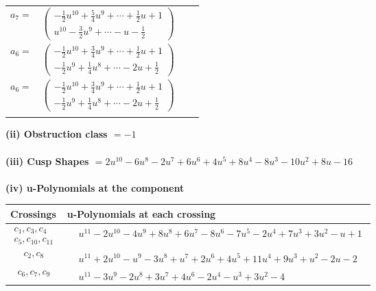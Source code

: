\documentclass[1p]{elsarticle_modified}
\theoremstyle{definition}
\begin{document}
\begin{tabular}{m{7pt} m{180pt} m{7pt} m{180pt} }
\flushright $a_{7}=$&$\begin{pmatrix}-\frac{1}{2} u^{10}+\frac{5}{4} u^9+\cdots+\frac{1}{2} u+1\\u^{10}-\frac{3}{2} u^9+\cdots- u-\frac{1}{2}\end{pmatrix}$ \\
\flushright $a_{6}=$&$\begin{pmatrix}-\frac{1}{2} u^{10}+\frac{3}{4} u^9+\cdots+\frac{1}{2} u+1\\-\frac{1}{2} u^9+\frac{1}{4} u^8+\cdots-2 u+\frac{1}{2}\end{pmatrix}$\\ \flushright $a_{6}=$&$\begin{pmatrix}-\frac{1}{2} u^{10}+\frac{3}{4} u^9+\cdots+\frac{1}{2} u+1\\-\frac{1}{2} u^9+\frac{1}{4} u^8+\cdots-2 u+\frac{1}{2}\end{pmatrix}$\\&\end{tabular}
\flushleft \textbf{(ii) Obstruction class $= -1$}\\~\\
\flushleft \textbf{(iii) Cusp Shapes $= 2 u^{10}-6 u^8-2 u^7+6 u^6+4 u^5+8 u^4-8 u^3-10 u^2+8 u-16$}\\~\\
\newpage\renewcommand{\arraystretch}{1}
\flushleft \textbf{(iv) u-Polynomials at the component}\newline \\
\begin{tabular}{m{50pt}|m{274pt}}
Crossings & \hspace{64pt}u-Polynomials at each crossing \\
\hline $$\begin{aligned}c_{1},c_{3},c_{4}\\c_{5},c_{10},c_{11}\end{aligned}$$&$\begin{aligned}
&u^{11}-2 u^{10}-4 u^9+8 u^8+6 u^7-8 u^6-7 u^5-2 u^4+7 u^3+3 u^2- u+1
\end{aligned}$\\
\hline $$\begin{aligned}c_{2},c_{8}\end{aligned}$$&$\begin{aligned}
&u^{11}+2 u^{10}- u^9-3 u^8+u^7+2 u^6+4 u^5+11 u^4+9 u^3+u^2-2 u-2
\end{aligned}$\\
\hline $$\begin{aligned}c_{6},c_{7},c_{9}\end{aligned}$$&$\begin{aligned}
&u^{11}-3 u^9-2 u^8+3 u^7+4 u^6-2 u^4- u^3+3 u^2-4
\end{aligned}$\\
\hline
\end{tabular}\\~\\
\end{document}
